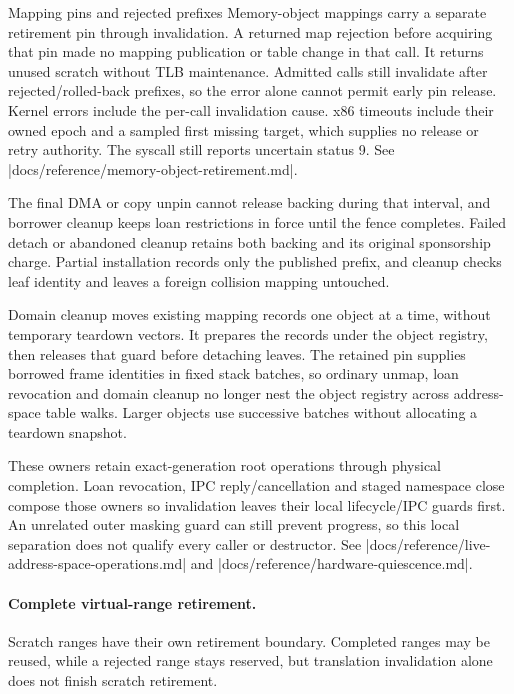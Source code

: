 \begin{implementationdetail}{Mapping pins and rejected prefixes}
Memory-object mappings carry a separate retirement pin through invalidation.
A returned map rejection before acquiring that pin made no mapping publication
or table change in that call. It returns unused scratch without TLB maintenance.
Admitted calls still invalidate after rejected/rolled-back prefixes, so the error
alone cannot permit early pin release. Kernel errors include the per-call
invalidation cause. x86 timeouts include their owned epoch and a sampled first
missing target, which supplies no release or retry authority. The syscall still
reports uncertain status 9. See
\repofile|docs/reference/memory-object-retirement.md|.

The final DMA or copy unpin cannot release backing during that interval, and
borrower cleanup keeps loan restrictions in force until the fence completes. Failed
detach or abandoned cleanup retains both backing and its original sponsorship
charge. Partial installation records only the published prefix, and cleanup checks
leaf identity and leaves a foreign collision mapping untouched.

Domain cleanup
moves existing mapping records one object at a time, without temporary teardown
vectors. It prepares the records under the object registry, then releases that
guard before detaching leaves. The retained pin supplies borrowed frame identities
in fixed stack batches, so ordinary unmap, loan revocation and domain cleanup no
longer nest the object registry across address-space table walks. Larger objects
use successive batches without allocating a teardown snapshot.

These owners
retain exact-generation root operations through physical completion. Loan
revocation, IPC reply/cancellation and staged namespace close compose those
owners so invalidation leaves their local lifecycle/IPC guards first. An
unrelated outer masking guard can still prevent progress, so this local separation
does not qualify every caller or destructor. See
\repofile|docs/reference/live-address-space-operations.md| and
\repofile|docs/reference/hardware-quiescence.md|.
\end{implementationdetail}

\paragraph*{Complete virtual-range retirement.}

Scratch ranges have their own retirement boundary. Completed ranges may be
reused, while a rejected range stays reserved, but translation invalidation alone
does not finish scratch retirement.

